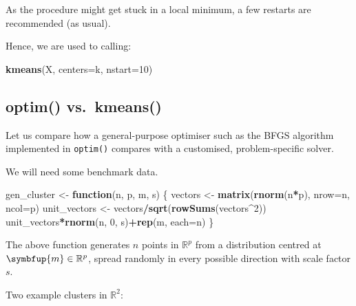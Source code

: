 \documentclass[10pt,b5paper,krantz1]{krantz}
\newenvironment{Shaded}{\begin{snugshade}}{\end{snugshade}}
\newcommand{\ControlFlowTok}[1]{\textcolor[rgb]{0.27,0.27,0.27}{\textbf{#1}}}
\newcommand{\DataTypeTok}[1]{\textcolor[rgb]{0.27,0.27,0.27}{#1}}
\newcommand{\DecValTok}[1]{\textcolor[rgb]{0.06,0.06,0.06}{#1}}
\newcommand{\KeywordTok}[1]{\textcolor[rgb]{0.27,0.27,0.27}{\textbf{#1}}}
\newcommand{\NormalTok}[1]{#1}
\newcommand{\OperatorTok}[1]{\textcolor[rgb]{0.43,0.43,0.43}{\textbf{#1}}}
\newcommand{\StringTok}[1]{\textcolor[rgb]{0.5,0.5,0.5}{#1}}
\renewcommand{\mathbf}[1]{\symbfup{#1}}
\begin{document}
As the procedure might get stuck in a local minimum,
a few restarts are recommended (as usual).

Hence, we are used to calling:

\begin{Shaded}
\begin{Highlighting}[]
\KeywordTok{kmeans}\NormalTok{(X, }\DataTypeTok{centers=}\NormalTok{k, }\DataTypeTok{nstart=}\DecValTok{10}\NormalTok{)}
\end{Highlighting}
\end{Shaded}

\hypertarget{optim-vs.-kmeans}{%
\subsection{optim() vs.~kmeans()}\label{optim-vs.-kmeans}}

Let us compare how a general-purpose optimiser such as the BFGS algorithm
implemented in \texttt{optim()} compares with a customised, problem-specific solver.

We will need some benchmark data.

\begin{Shaded}
\begin{Highlighting}[]
\NormalTok{gen_cluster <-}\StringTok{ }\ControlFlowTok{function}\NormalTok{(n, p, m, s) \{}
\NormalTok{    vectors <-}\StringTok{ }\KeywordTok{matrix}\NormalTok{(}\KeywordTok{rnorm}\NormalTok{(n}\OperatorTok{*}\NormalTok{p), }\DataTypeTok{nrow=}\NormalTok{n, }\DataTypeTok{ncol=}\NormalTok{p)}
\NormalTok{    unit_vectors <-}\StringTok{ }\NormalTok{vectors}\OperatorTok{/}\KeywordTok{sqrt}\NormalTok{(}\KeywordTok{rowSums}\NormalTok{(vectors}\OperatorTok{^}\DecValTok{2}\NormalTok{))}
\NormalTok{    unit_vectors}\OperatorTok{*}\KeywordTok{rnorm}\NormalTok{(n, }\DecValTok{0}\NormalTok{, s)}\OperatorTok{+}\KeywordTok{rep}\NormalTok{(m, }\DataTypeTok{each=}\NormalTok{n)}
\NormalTok{\}}
\end{Highlighting}
\end{Shaded}

The above function generates \(n\) points in \(\mathbb{R}^p\)
from a distribution centred at \(\mathbf{m}\in\mathbb{R}^p\),
spread randomly in every possible direction with scale factor \(s\).

Two example clusters in \(\mathbb{R}^2\):
\end{document}

